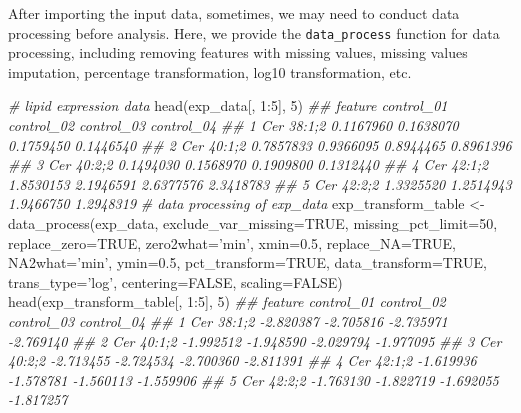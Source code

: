 \documentclass[]{article}
\newcommand{\hlnum}[1]{\textcolor[rgb]{0.816,0.125,0.439}{#1}}%
\newcommand{\hlstr}[1]{\textcolor[rgb]{0.251,0.627,0.251}{#1}}%
\newcommand{\hlcom}[1]{\textcolor[rgb]{0.502,0.502,0.502}{\textit{#1}}}%
\newcommand{\hlopt}[1]{\textcolor[rgb]{0,0,0}{#1}}%
\newcommand{\hlstd}[1]{\textcolor[rgb]{0.251,0.251,0.251}{#1}}%
\newcommand{\hlkwc}[1]{\textcolor[rgb]{0.251,0.251,0.251}{#1}}%
\newcommand{\hlkwd}[1]{\textcolor[rgb]{0.878,0.439,0.125}{#1}}%
\newenvironment{Shaded}{\begin{myshaded}}{\end{myshaded}}
\newcommand{\KeywordTok}[1]{\hlkwd{#1}}
\newcommand{\DataTypeTok}[1]{\hlkwc{#1}}
\newcommand{\DecValTok}[1]{\hlnum{#1}}
\newcommand{\FloatTok}[1]{\hlnum{#1}}
\newcommand{\StringTok}[1]{\hlstr{#1}}
\newcommand{\CommentTok}[1]{\hlcom{#1}}
\newcommand{\OtherTok}[1]{{#1}}
\newcommand{\OperatorTok}[1]{\hlopt{#1}}
\newcommand{\NormalTok}[1]{\hlstd{#1}}
\begin{document}
After importing the input data, sometimes, we may need to conduct data processing before analysis. Here, we provide the \texttt{data\_process} function for data processing, including removing features with missing values, missing values imputation, percentage transformation, log10 transformation, etc.

\begin{Shaded}
\begin{Highlighting}[]
\CommentTok{# lipid expression data}
\KeywordTok{head}\NormalTok{(exp_data[, }\DecValTok{1}\OperatorTok{:}\DecValTok{5}\NormalTok{], }\DecValTok{5}\NormalTok{)}
\CommentTok{##      feature control_01 control_02 control_03 control_04}
\CommentTok{## 1 Cer 38:1;2  0.1167960  0.1638070  0.1759450  0.1446540}
\CommentTok{## 2 Cer 40:1;2  0.7857833  0.9366095  0.8944465  0.8961396}
\CommentTok{## 3 Cer 40:2;2  0.1494030  0.1568970  0.1909800  0.1312440}
\CommentTok{## 4 Cer 42:1;2  1.8530153  2.1946591  2.6377576  2.3418783}
\CommentTok{## 5 Cer 42:2;2  1.3325520  1.2514943  1.9466750  1.2948319}
\CommentTok{# data processing of exp_data}
\NormalTok{exp_transform_table <-}\StringTok{ }\KeywordTok{data_process}\NormalTok{(exp_data, }\DataTypeTok{exclude_var_missing=}\OtherTok{TRUE}\NormalTok{,}
                                    \DataTypeTok{missing_pct_limit=}\DecValTok{50}\NormalTok{, }
                                    \DataTypeTok{replace_zero=}\OtherTok{TRUE}\NormalTok{, }\DataTypeTok{zero2what=}\StringTok{'min'}\NormalTok{, }
                                    \DataTypeTok{xmin=}\FloatTok{0.5}\NormalTok{, }\DataTypeTok{replace_NA=}\OtherTok{TRUE}\NormalTok{,}
                                    \DataTypeTok{NA2what=}\StringTok{'min'}\NormalTok{, }\DataTypeTok{ymin=}\FloatTok{0.5}\NormalTok{, }
                                    \DataTypeTok{pct_transform=}\OtherTok{TRUE}\NormalTok{,}
                                    \DataTypeTok{data_transform=}\OtherTok{TRUE}\NormalTok{, }\DataTypeTok{trans_type=}\StringTok{'log'}\NormalTok{,}
                                    \DataTypeTok{centering=}\OtherTok{FALSE}\NormalTok{, }\DataTypeTok{scaling=}\OtherTok{FALSE}\NormalTok{)}
\KeywordTok{head}\NormalTok{(exp_transform_table[, }\DecValTok{1}\OperatorTok{:}\DecValTok{5}\NormalTok{], }\DecValTok{5}\NormalTok{)}
\CommentTok{##      feature control_01 control_02 control_03 control_04}
\CommentTok{## 1 Cer 38:1;2  -2.820387  -2.705816  -2.735971  -2.769140}
\CommentTok{## 2 Cer 40:1;2  -1.992512  -1.948590  -2.029794  -1.977095}
\CommentTok{## 3 Cer 40:2;2  -2.713455  -2.724534  -2.700360  -2.811391}
\CommentTok{## 4 Cer 42:1;2  -1.619936  -1.578781  -1.560113  -1.559906}
\CommentTok{## 5 Cer 42:2;2  -1.763130  -1.822719  -1.692055  -1.817257}
\end{Highlighting}
\end{Shaded}
\end{document}
